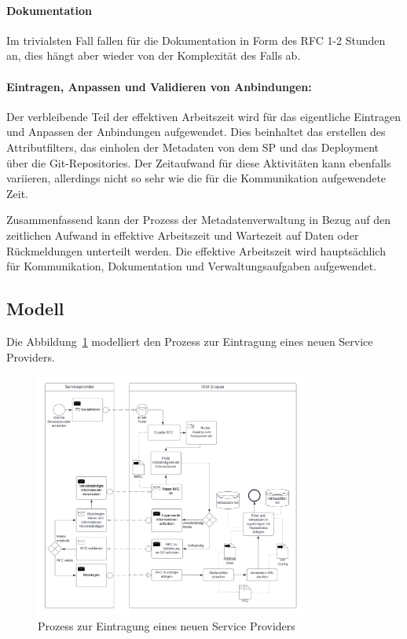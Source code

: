 \documentclass[a4paper, fontsize=11pt]{scrartcl}
\begin{document}
\paragraph{Dokumentation}
Im trivialsten Fall fallen für die Dokumentation in Form des RFC 1-2 Stunden an, dies hängt aber wieder von der Komplexität des Falls ab. 
\paragraph{Eintragen, Anpassen und Validieren von Anbindungen:}
Der verbleibende Teil der effektiven Arbeitszeit wird für das eigentliche Eintragen und Anpassen der Anbindungen aufgewendet.
Dies beinhaltet das erstellen des Attributfilters, das einholen der Metadaten von dem SP und das Deployment über die Git-Repositories.
Der Zeitaufwand für diese Aktivitäten kann ebenfalls variieren, allerdings nicht so sehr wie die für die Kommunikation aufgewendete Zeit.


Zusammenfassend kann der Prozess der Metadatenverwaltung in Bezug auf den zeitlichen Aufwand in effektive Arbeitszeit und Wartezeit auf Daten oder Rückmeldungen unterteilt werden. 
Die effektive Arbeitszeit wird hauptsächlich für Kommunikation, Dokumentation und Verwaltungsaufgaben aufgewendet.

\newpage
\subsection{Modell}
Die Abbildung~\ref{fig:service-provider-erstellung} modelliert den Prozess zur Eintragung eines neuen Service Providers.
\begin{figure}[H]
  \centering
  \includegraphics[width=0.8\textwidth]{res/Service Provider Erstellung.png}
  \caption{Prozess zur Eintragung eines neuen Service Providers}\label{fig:service-provider-erstellung}
\end{figure}
\end{document}
